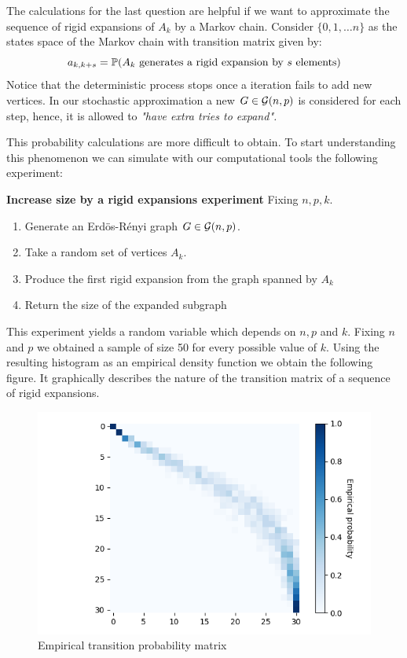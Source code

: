The calculations for the last question are helpful if we want to approximate the sequence of rigid expansions of $A_{k}$ by a Markov chain. Consider $\{0,1, \dots n\}$ as the states space of the Markov chain with transition matrix given by:
$$ a_{k,k+s} = \P(A_{k} \text{ generates a rigid expansion by } s \text{ elements})$$
Notice that the deterministic process stops once a iteration fails to add new vertices. In our stochastic approximation a new $G \in \G(n,p)$ is considered for each step, hence, it is allowed to \textit{"have extra tries to expand".}

This probability calculations are more difficult to obtain. To start understanding this phenomenon we can simulate with our computational tools the following experiment:
 
\begin{cajita}                                                                                                                                                                
\textbf{Increase size by a rigid expansions experiment} \hfill \break
Fixing $n,p,k$.
\begin{enumerate}
\item Generate an Erdös-Rényi graph $G\in \G(n,p)$.
\item Take a random set of vertices $A_{k}$.
\item Produce the first rigid expansion from the graph spanned by $A_{k}$
\item Return the size of the expanded subgraph
\end{enumerate}
\end{cajita}

This experiment yields a random variable which depends on $n, p$ and $k$. Fixing $n$ and $p$ we obtained a sample of size 50 for every possible value of $k$. Using the resulting histogram as an empirical density function we obtain the following figure. It graphically describes the nature of the transition matrix of a sequence of rigid expansions.

\begin{figure}[h!]
	\centering
	\includegraphics[scale=0.7]{Python/Figures/Transition-matrix-secuence-of-rigid-expansions.png}
	\caption{Empirical transition probability matrix}
\end{figure}

